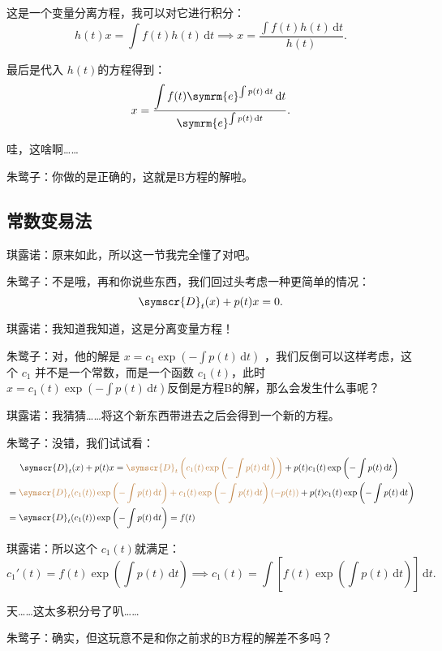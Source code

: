 \documentclass{ctexart}
\newcommand{\dx}{\symscr{D} _t (x)}
\begin{document}
这是一个变量分离方程，我可以对它进行积分：
\[
    h(t)x= \int f(t)h(t) \,\mathrm{d}t \implies x= \frac{\displaystyle \int f(t)h(t) \,\mathrm{d}t}{h(t)}
    .\]

最后是代入 \(h(t)\)的方程得到：
\[
    x=\frac{\displaystyle \int f(t)\symrm{e} ^{\int p(t) \,\mathrm{d}t } \,\mathrm{d}t}{\symrm{e} ^{\int p(t) \,\mathrm{d}t }}
    .\]

哇，这啥啊……

朱鹭子：你做的是正确的，这就是B方程的解啦。

\subsection{常数变易法}

琪露诺：原来如此，所以这一节我完全懂了对吧。

朱鹭子：不是哦，再和你说些东西，我们回过头考虑一种更简单的情况：
\[
    \dx+p(t)x=0
    .\]

琪露诺：我知道我知道，这是分离变量方程！

朱鹭子：对，他的解是 \(x=c_1\exp \left(- \int p(t) \,\mathrm{d}t  \right) \) ，我们反倒可以这样考虑，这个 \(c_1\) 并不是一个常数，而是一个函数 \(c_1(t)\)，此时 \(x=c_1(t)\exp \left(- \int p(t) \,\mathrm{d}t  \right)\)反倒是方程B的解，那么会发生什么事呢？

琪露诺：我猜猜……将这个新东西带进去之后会得到一个新的方程。

朱鹭子：没错，我们试试看：
\[
    \begin{aligned}
         & \phantom{=}\ \,\,\dx+p(t)x={\color{brown}\symscr{D} _t\left( c_1(t)\exp \left(- \int p(t) \,\mathrm{d}t  \right) \right)} +p(t) c_1(t)\exp \left(- \int p(t) \,\mathrm{d}t  \right)
        \\
         & ={\color{brown}\symscr{D} _t(c_1(t))\exp \left(- \int p(t) \,\mathrm{d}t  \right)+c_1(t)\exp \left(- \int p(t) \,\mathrm{d}t  \right)(-p(t))}+p(t) c_1(t)\exp \left(- \int p(t) \,\mathrm{d}t  \right) \\
         & = \symscr{D} _t(c_1(t))\exp \left(- \int p(t) \,\mathrm{d}t  \right) =f(t)
    \end{aligned}
\]

琪露诺：所以这个 \(c_1(t)\)就满足：
\[
    c_1'(t)=f(t)\exp \left(\int p(t) \,\mathrm{d}t  \right) \implies c_1(t)=\int \left[ f(t)\exp \left(\int p(t) \,\mathrm{d}t  \right)  \right]  \,\mathrm{d}t
    .\]

天……这太多积分号了叭……

朱鹭子：确实，但这玩意不是和你之前求的B方程的解差不多吗？
\end{document}
